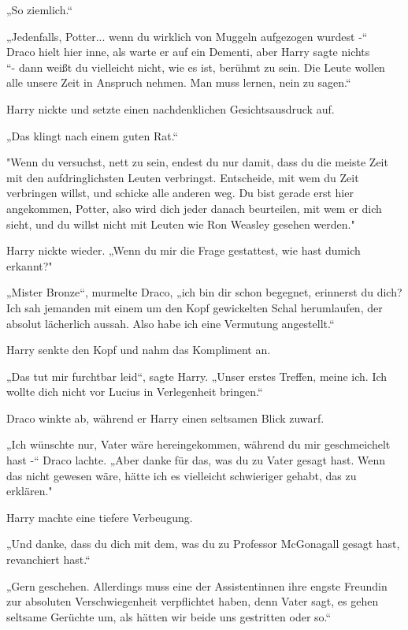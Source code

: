 {„So ziemlich.“

„Jedenfalls, Potter... wenn du wirklich von Muggeln aufgezogen wurdest -“\\ Draco hielt hier inne, als warte er auf ein Dementi, aber Harry sagte nichts\\ “- dann weißt du vielleicht nicht, wie es ist, berühmt zu sein. Die Leute wollen alle unsere Zeit in Anspruch nehmen. Man muss lernen, nein zu sagen.“

Harry nickte und setzte einen nachdenklichen Gesichtsausdruck auf.

„Das klingt nach einem guten Rat.“

"Wenn du versuchst, nett zu sein, endest du nur damit, dass du die meiste Zeit mit den aufdringlichsten Leuten verbringst. Entscheide, mit wem du Zeit verbringen willst, und schicke alle anderen weg. Du bist gerade erst hier angekommen, Potter, also wird dich jeder danach beurteilen, mit wem er dich sieht, und du willst nicht mit Leuten wie Ron Weasley gesehen werden."

Harry nickte wieder. „Wenn du mir die Frage gestattest, wie hast dumich erkannt?"

„Mister Bronze“, murmelte Draco, „ich bin dir schon begegnet, erinnerst du dich? Ich sah jemanden mit einem um den Kopf gewickelten Schal herumlaufen, der absolut lächerlich aussah. Also habe ich eine Vermutung angestellt.“

Harry senkte den Kopf und nahm das Kompliment an.

„Das tut mir furchtbar leid“, sagte Harry. „Unser erstes Treffen, meine ich. Ich wollte dich nicht vor Lucius in Verlegenheit bringen.“

Draco winkte ab, während er Harry einen seltsamen Blick zuwarf.

„Ich wünschte nur, Vater wäre hereingekommen, während du mir geschmeichelt hast -“ Draco lachte. „Aber danke für das, was du zu Vater gesagt hast. Wenn das nicht gewesen wäre, hätte ich es vielleicht schwieriger gehabt, das zu erklären."

Harry machte eine tiefere Verbeugung.

„Und danke, dass du dich mit dem, was du zu Professor McGonagall gesagt hast, revanchiert hast.“

„Gern geschehen. Allerdings muss eine der Assistentinnen ihre engste Freundin zur absoluten Verschwiegenheit verpflichtet haben, denn Vater sagt, es gehen seltsame Gerüchte um, als hätten wir beide uns gestritten oder so.“

}
